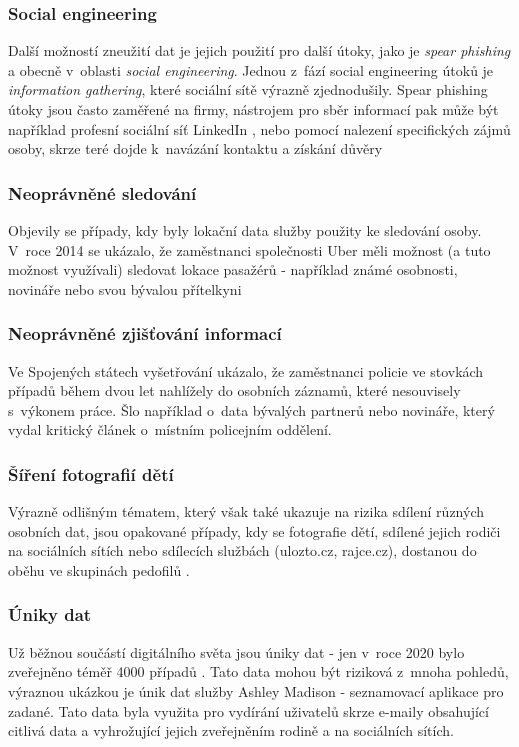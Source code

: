 \subsubsection{Social engineering}
Další možností zneužití dat je jejich použití pro další útoky, jako je \textit{spear phishing} a obecně v~oblasti \textit{social engineering}. Jednou z~fází social engineering útoků je \textit{information gathering}\citep{social-engineering-definition}, které sociální sítě výrazně zjednodušily. Spear phishing útoky jsou často zaměřené na firmy, nástrojem pro sběr informací pak může být například profesní sociální síť LinkedIn \citep{social-engineering-tools}, nebo pomocí nalezení specifických zájmů osoby, skrze teré dojde k~navázání kontaktu a získání důvěry \citep{social-engineering-book}

\subsubsection{Neoprávněné sledování}
Objevily se případy, kdy byly lokační data služby použity ke sledování osoby. V~roce 2014 se ukázalo, že zaměstnanci společnosti Uber měli možnost (a tuto možnost využívali) sledovat lokace pasažérů - například známé osobnosti, novináře nebo svou bývalou přítelkyni\citep{uber-spying}

\subsubsection{Neoprávněné zjišťování informací}
Ve Spojených státech vyšetřování ukázalo, že zaměstnanci policie ve stovkách případů během dvou let nahlížely do osobních záznamů, které nesouvisely s~výkonem práce. Šlo například o~data bývalých partnerů nebo novináře, který vydal kritický článek o~místním policejním oddělení.\citep{police-spying} 

\subsubsection{Šíření fotografií dětí}
Výrazně odlišným tématem, který však také ukazuje na rizika sdílení různých osobních dat, jsou opakované případy, kdy se fotografie dětí, sdílené jejich rodiči na sociálních sítích nebo sdílecích službách (ulozto.cz, rajce.cz), dostanou do oběhu ve skupinách pedofilů \citep{pedophiles-web}.

\subsubsection{Úniky dat}
Už běžnou součástí digitálního světa jsou úniky dat - jen v~roce 2020 bylo zveřejněno téměř 4000 případů \citep{data-breaches-2021}. Tato data mohou být riziková z~mnoha pohledů, výraznou ukázkou je únik dat služby Ashley Madison - seznamovací aplikace pro zadané. Tato data byla využita pro vydírání uživatelů skrze e-maily obsahující citlivá data a vyhrožující jejich zveřejněním rodině a na sociálních sítích.\citep{ashley-madison-leak}


